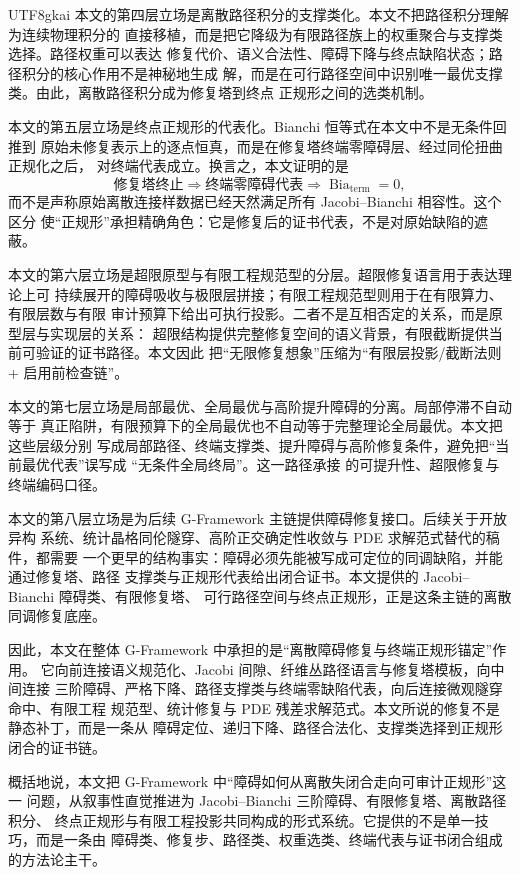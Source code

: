 \documentclass[12pt]{article}
\newcommand{\GFramework}{\textsf{G-Framework}}
\newcommand{\Bia}{\operatorname{Bia}}
\begin{document}
\begin{CJK*}{UTF8}{gkai}
本文的第四层立场是离散路径积分的支撑类化。本文不把路径积分理解为连续物理积分的
直接移植，而是把它降级为有限路径族上的权重聚合与支撑类选择。路径权重可以表达
修复代价、语义合法性、障碍下降与终点缺陷状态；路径积分的核心作用不是神秘地生成
解，而是在可行路径空间中识别唯一最优支撑类。由此，离散路径积分成为修复塔到终点
正规形之间的选类机制。

本文的第五层立场是终点正规形的代表化。Bianchi 恒等式在本文中不是无条件回推到
原始未修复表示上的逐点恒真，而是在修复塔终端零障碍层、经过同伦扭曲正规化之后，
对终端代表成立。换言之，本文证明的是
\[
  \text{修复塔终止}
  \Longrightarrow
  \text{终端零障碍代表}
  \Longrightarrow
  \Bia_{\mathrm{term}}=0,
\]
而不是声称原始离散连接样数据已经天然满足所有 Jacobi--Bianchi 相容性。这个区分
使“正规形”承担精确角色：它是修复后的证书代表，不是对原始缺陷的遮蔽。

本文的第六层立场是超限原型与有限工程规范型的分层。超限修复语言用于表达理论上可
持续展开的障碍吸收与极限层拼接；有限工程规范型则用于在有限算力、有限层数与有限
审计预算下给出可执行投影。二者不是互相否定的关系，而是原型层与实现层的关系：
超限结构提供完整修复空间的语义背景，有限截断提供当前可验证的证书路径。本文因此
把“无限修复想象”压缩为“有限层投影/截断法则 + 启用前检查链”。

本文的第七层立场是局部最优、全局最优与高阶提升障碍的分离。局部停滞不自动等于
真正陷阱，有限预算下的全局最优也不自动等于完整理论全局最优。本文把这些层级分别
写成局部路径、终端支撑类、提升障碍与高阶修复条件，避免把“当前最优代表”误写成
“无条件全局终局”。这一路径承接
\cite{RepoTex29TransfiniteRepair,RepoTex32ConditionalConvergence,RepoTex36HomotopyTwistBijection}
的可提升性、超限修复与终端编码口径。

本文的第八层立场是为后续 \GFramework{} 主链提供障碍修复接口。后续关于开放异构
系统、统计晶格同伦隧穿、高阶正交确定性收敛与 PDE 求解范式替代的稿件，都需要
一个更早的结构事实：障碍必须先能被写成可定位的同调缺陷，并能通过修复塔、路径
支撑类与正规形代表给出闭合证书。本文提供的 Jacobi--Bianchi 障碍类、有限修复塔、
可行路径空间与终点正规形，正是这条主链的离散同调修复底座。

因此，本文在整体 \GFramework{} 中承担的是“离散障碍修复与终端正规形锚定”作用。
它向前连接语义规范化、Jacobi 间隙、纤维丛路径语言与修复塔模板，向中间连接
三阶障碍、严格下降、路径支撑类与终端零缺陷代表，向后连接微观隧穿命中、有限工程
规范型、统计修复与 PDE 残差求解范式。本文所说的修复不是静态补丁，而是一条从
障碍定位、递归下降、路径合法化、支撑类选择到正规形闭合的证书链。

概括地说，本文把 \GFramework{} 中“障碍如何从离散失闭合走向可审计正规形”这一
问题，从叙事性直觉推进为 Jacobi--Bianchi 三阶障碍、有限修复塔、离散路径积分、
终点正规形与有限工程投影共同构成的形式系统。它提供的不是单一技巧，而是一条由
障碍类、修复步、路径类、权重选类、终端代表与证书闭合组成的方法论主干。


\end{CJK*}
\end{document}
